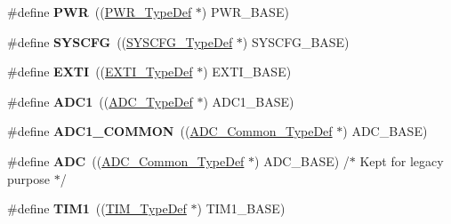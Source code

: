 \begin{DoxyCompactItemize}
\mbox{\label{group___peripheral__declaration_ga04651c526497822a859942b928e57f8e}} 
\#define {\bfseries P\+WR}~((\hyperlink{struct_p_w_r___type_def}{P\+W\+R\+\_\+\+Type\+Def} $\ast$) P\+W\+R\+\_\+\+B\+A\+SE)
\item 
\mbox{\label{group___peripheral__declaration_ga3c833fe1c486cb62250ccbca32899cb8}} 
\#define {\bfseries S\+Y\+S\+C\+FG}~((\hyperlink{struct_s_y_s_c_f_g___type_def}{S\+Y\+S\+C\+F\+G\+\_\+\+Type\+Def} $\ast$) S\+Y\+S\+C\+F\+G\+\_\+\+B\+A\+SE)
\item 
\mbox{\label{group___peripheral__declaration_ga9189e770cd9b63dadd36683eb9843cac}} 
\#define {\bfseries E\+X\+TI}~((\hyperlink{struct_e_x_t_i___type_def}{E\+X\+T\+I\+\_\+\+Type\+Def} $\ast$) E\+X\+T\+I\+\_\+\+B\+A\+SE)
\item 
\mbox{\label{group___peripheral__declaration_ga90d2d5c526ce5c0a551f533eccbee71a}} 
\#define {\bfseries A\+D\+C1}~((\hyperlink{struct_a_d_c___type_def}{A\+D\+C\+\_\+\+Type\+Def} $\ast$) A\+D\+C1\+\_\+\+B\+A\+SE)
\item 
\mbox{\label{group___peripheral__declaration_gaf1919c64fc774aab31190346fd5457e2}} 
\#define {\bfseries A\+D\+C1\+\_\+\+C\+O\+M\+M\+ON}~((\hyperlink{struct_a_d_c___common___type_def}{A\+D\+C\+\_\+\+Common\+\_\+\+Type\+Def} $\ast$) A\+D\+C\+\_\+\+B\+A\+SE)
\item 
\mbox{\label{group___peripheral__declaration_ga54d148b91f3d356713f7e367a2243bea}} 
\#define {\bfseries A\+DC}~((\hyperlink{struct_a_d_c___common___type_def}{A\+D\+C\+\_\+\+Common\+\_\+\+Type\+Def} $\ast$) A\+D\+C\+\_\+\+B\+A\+SE) /$\ast$ Kept for legacy purpose $\ast$/
\item 
\mbox{\label{group___peripheral__declaration_ga2e87451fea8dc9380056d3cfc5ed81fb}} 
\#define {\bfseries T\+I\+M1}~((\hyperlink{struct_t_i_m___type_def}{T\+I\+M\+\_\+\+Type\+Def} $\ast$) T\+I\+M1\+\_\+\+B\+A\+SE)
\item 
\mbox{\label{group___peripheral__declaration_gad483be344a28ac800be8f03654a9612f}} 

\end{DoxyCompactItemize}
